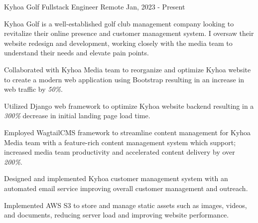 \cventry
{Kyhoa Golf} %
{Fullstack Engineer} %
{Remote}
{Jan, 2023 - Present} %
{
	Kyhoa Golf is a well-established golf club management company looking to revitalize their online presence and customer management system.
	I oversaw their website redesign and development, working closely with the media team to understand their needs and elevate pain points.
	\begin{cvitems}
		\item {Collaborated with Kyhoa Media team to reorganize and optimize Kyhoa website to create a modern web application using Bootstrap resulting in an increase in web traffic by \emph{50\%}.}
		\item {Utilized Django web framework to optimize Kyhoa website backend resulting in a \emph{300\%} decrease in initial landing page load time.}
		\item {Employed WagtailCMS framework to streamline content management for Kyhoa Media team with a feature-rich content management system which support; increased media team productivity and accelerated content delivery by over \emph{200\%}.}
		\item {Designed and implemented Kyhoa customer management system with an automated email service improving overall customer management and outreach.}
		\item {Implemented AWS S3 to store and manage static assets such as images, videos, and documents, reducing server load and improving website performance.}
	\end{cvitems}
}

